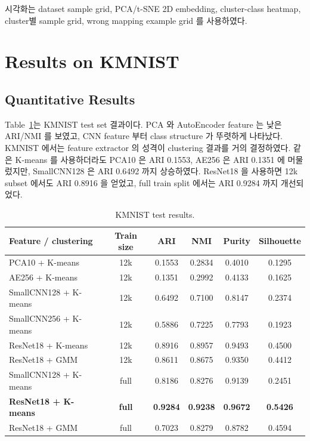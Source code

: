 \documentclass[11pt]{article}
\begin{document}
시각화는 dataset sample grid, PCA/t-SNE 2D embedding, cluster-class heatmap, cluster별 sample grid, wrong mapping example grid 를 사용하였다.

\section{Results on KMNIST}

\subsection{Quantitative Results}

Table~\ref{tab:kmnist-results}는 KMNIST test set 결과이다.
PCA 와 AutoEncoder feature 는 낮은 ARI/NMI 를 보였고, CNN feature 부터 class structure 가 뚜렷하게 나타났다.
KMNIST 에서는 feature extractor 의 성격이 clustering 결과를 거의 결정하였다.
같은 K-means 를 사용하더라도 PCA10 은 ARI 0.1553, AE256 은 ARI 0.1351 에 머물렀지만, SmallCNN128 은 ARI 0.6492 까지 상승하였다.
ResNet18 을 사용하면 12k subset 에서도 ARI 0.8916 을 얻었고, full train split 에서는 ARI 0.9284 까지 개선되었다.

\begin{table}[H]
    \centering
    \caption{KMNIST test results.}
    \label{tab:kmnist-results}
    \small
    \begin{tabular}{lccccc}
        \toprule
        Feature / clustering & Train size & ARI & NMI & Purity & Silhouette\\
        \midrule
        PCA10 + K-means & 12k & 0.1553 & 0.2834 & 0.4010 & 0.1295\\
        AE256 + K-means & 12k & 0.1351 & 0.2992 & 0.4133 & 0.1625\\
        SmallCNN128 + K-means & 12k & 0.6492 & 0.7100 & 0.8147 & 0.2374\\
        SmallCNN256 + K-means & 12k & 0.5886 & 0.7225 & 0.7793 & 0.1923\\
        ResNet18 + K-means & 12k & 0.8916 & 0.8957 & 0.9493 & 0.4500\\
        ResNet18 + GMM & 12k & 0.8611 & 0.8675 & 0.9350 & 0.4412\\
        SmallCNN128 + K-means & full & 0.8186 & 0.8276 & 0.9139 & 0.2451\\
        \textbf{ResNet18 + K-means} & \textbf{full} & \textbf{0.9284} & \textbf{0.9238} & \textbf{0.9672} & \textbf{0.5426}\\
        ResNet18 + GMM & full & 0.7023 & 0.8279 & 0.8782 & 0.4594\\
        \bottomrule
    \end{tabular}
\end{table}
\end{document}
